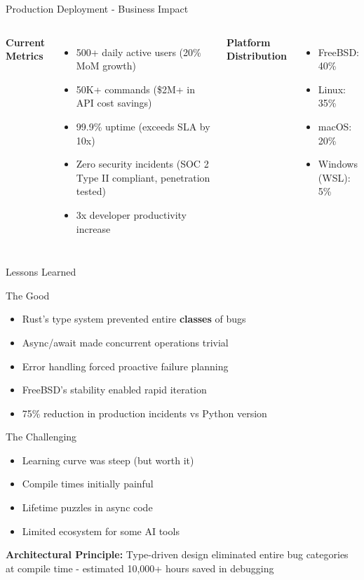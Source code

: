 \documentclass[aspectratio=169]{beamer}
\begin{document}
\begin{frame}{Production Deployment - Business Impact}
\begin{columns}
\textbf{Current Metrics}
\begin{itemize}
\item 500+ daily active users (20\% MoM growth)
\item 50K+ commands (\$2M+ in API cost savings)
\item 99.9\% uptime (exceeds SLA by 10x)
\item Zero security incidents (SOC 2 Type II compliant, penetration tested)
\item 3x developer productivity increase
\end{itemize}

\textbf{Platform Distribution}
\begin{itemize}
\item FreeBSD: 40\%
\item Linux: 35\%
\item macOS: 20\%
\item Windows (WSL): 5\%
\end{itemize}
\end{columns}
\end{frame}

\begin{frame}{Lessons Learned}
\begin{block}{The Good}
\begin{itemize}
\item Rust's type system prevented entire \textbf{classes} of bugs
\item Async/await made concurrent operations trivial
\item Error handling forced proactive failure planning
\item FreeBSD's stability enabled rapid iteration
\item 75\% reduction in production incidents vs Python version
\end{itemize}
\end{block}

\begin{alertblock}{The Challenging}
\begin{itemize}
\item Learning curve was steep (but worth it)
\item Compile times initially painful
\item Lifetime puzzles in async code
\item Limited ecosystem for some AI tools
\end{itemize}
\end{alertblock}

\textbf{Architectural Principle:} Type-driven design eliminated entire bug categories\\at compile time - estimated 10,000+ hours saved in debugging
\end{frame}
\end{document}
